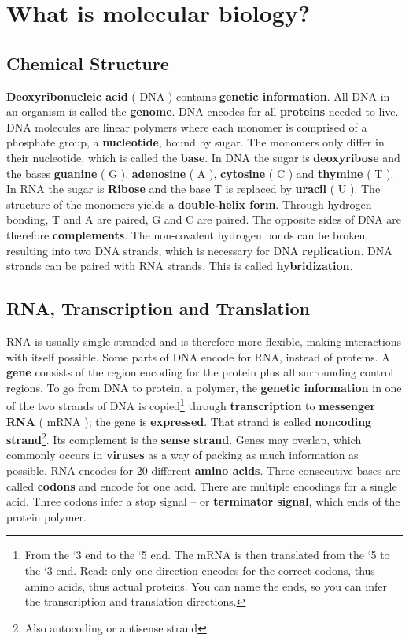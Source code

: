 \documentclass[10pt,a4paper]{report}
\begin{document}
	\clearpage

	\section{What is molecular biology?}
	\subsection{Chemical Structure}
	\textbf{Deoxyribonucleic acid} ( DNA ) contains \textbf{genetic information}. 
	All DNA in an organism is called the \textbf{genome}. 
	DNA encodes for all \textbf{proteins} needed to live. 
	DNA molecules are linear polymers where each monomer is comprised of a phosphate group, a \textbf{nucleotide}, bound by sugar. 
	The monomers only differ in their nucleotide, which is called the \textbf{base}. In DNA the sugar is \textbf{deoxyribose} and the bases \textbf{guanine} ( G ), \textbf{adenosine} ( A ), \textbf{cytosine} ( C ) and \textbf{thymine} ( T ). 
	In RNA the sugar is \textbf{Ribose} and the base T is replaced by \textbf{uracil} ( U ). 
	The structure of the monomers yields a \textbf{double-helix form}. 
	Through hydrogen bonding, T and A are paired, G and C are paired. 
	The opposite sides of DNA are therefore \textbf{complements}.  
	The non-covalent hydrogen bonds can be broken, resulting into two DNA strands, which is necessary for DNA \textbf{replication}. 
	DNA strands can be paired with RNA strands. This is called \textbf{hybridization}. 
	
	\subsection{RNA, Transcription and Translation}
	RNA is usually single stranded and is therefore more flexible, making interactions with itself possible. 
	Some parts of DNA encode for RNA, instead of proteins. 
	A \textbf{gene} consists of the region encoding for the protein plus all surrounding control regions. 
	To go from DNA to protein, a polymer, the \textbf{genetic information} in one of the two strands of DNA is copied\footnote{From the ‘3 end to the ‘5 end. The mRNA is then translated from the ‘5 to the ‘3 end.
	Read: only one direction encodes for the correct codons, thus amino acids, thus actual proteins. 
	You can name the ends, so you can infer the transcription and translation directions.}  through \textbf{transcription} to \textbf{messenger RNA} ( mRNA ); the gene is \textbf{expressed}. 
	That strand is called \textbf{noncoding strand}\footnote{Also antocoding or antisense strand}. 
	Its complement is the \textbf{sense strand}. 
	Genes may overlap, which commonly occurs in \textbf{viruses} as a way of packing as much information as possible. 
	RNA encodes for 20 different \textbf{amino acids}. 
	Three consecutive bases are called \textbf{codons} and encode for one acid. 
	There are multiple encodings for a single acid. 
	Three codons infer a stop signal – or \textbf{terminator signal}, which ends of the protein polymer.
	
\end{document}
